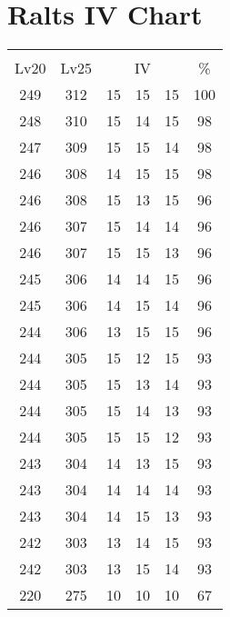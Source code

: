 \documentclass{article}%
\begin{document}
%
\normalsize%
\section{Ralts IV Chart}%
\label{sec:Ralts IV Chart}%
\renewcommand{\arraystretch}{1.5}%
\begin{tabular}{|c|c|c|c|c|c|}%
\hline%
\multicolumn{6}{|c|}{\textcolor{white}{ 
\linebreak{Ralts}
}%
\cellcolor{black}}\\%
\multicolumn{1}{|c}{Lv20}&\multicolumn{1}{c|}{Lv25}&\multicolumn{3}{c|}{IV}&\multicolumn{1}{|c|}{\%}\\%
\hline%
\rowcolor{color100}%
249&312&15&15&15&100\\%
\hline%
\rowcolor{color98}%
248&310&15&14&15&98\\%
\hline%
\rowcolor{color98}%
247&309&15&15&14&98\\%
\hline%
\rowcolor{color98}%
246&308&14&15&15&98\\%
\hline%
\rowcolor{color96}%
246&308&15&13&15&96\\%
\hline%
\rowcolor{color96}%
246&307&15&14&14&96\\%
\hline%
\rowcolor{color96}%
246&307&15&15&13&96\\%
\hline%
\rowcolor{color96}%
245&306&14&14&15&96\\%
\hline%
\rowcolor{color96}%
245&306&14&15&14&96\\%
\hline%
\rowcolor{color96}%
244&306&13&15&15&96\\%
\hline%
\rowcolor{color93}%
244&305&15&12&15&93\\%
\hline%
\rowcolor{color93}%
244&305&15&13&14&93\\%
\hline%
\rowcolor{color93}%
244&305&15&14&13&93\\%
\hline%
\rowcolor{color93}%
244&305&15&15&12&93\\%
\hline%
\rowcolor{color93}%
243&304&14&13&15&93\\%
\hline%
\rowcolor{color93}%
243&304&14&14&14&93\\%
\hline%
\rowcolor{color93}%
243&304&14&15&13&93\\%
\hline%
\rowcolor{color93}%
242&303&13&14&15&93\\%
\hline%
\rowcolor{color93}%
242&303&13&15&14&93\\%
\hline%
\rowcolor{color91}%
220&275&10&10&10&67\\%
\end{tabular}

%
\end{document}
